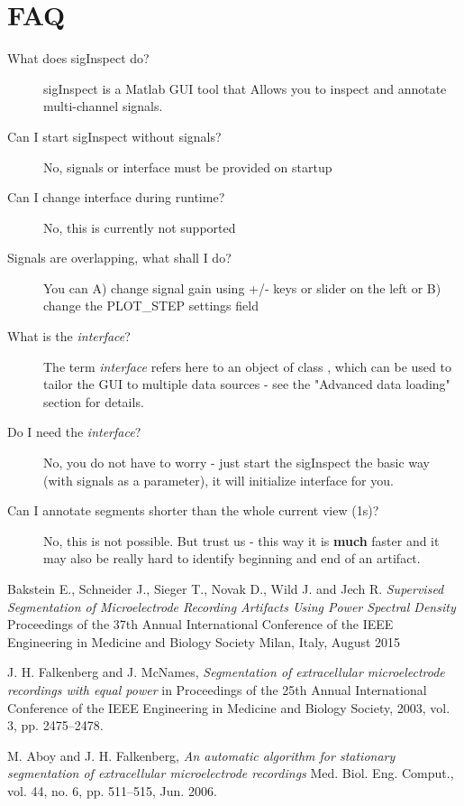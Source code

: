 \documentclass[a4paper,10pt]{article}
\begin{document}
\section{FAQ}
\begin{description}
	\item[What does sigInspect do?] sigInspect is a Matlab GUI tool that Allows you to inspect and annotate multi-channel signals.
	\item[Can I start sigInspect without signals?] No, signals or interface must be provided on startup
	\item[Can I change interface during runtime?] No, this is currently not supported
	\item[Signals are overlapping, what shall I do?] You can A) change signal gain using +/- keys or slider on the left or B) change the PLOT\_STEP settings field
\item[What is the \emph{interface}?] The term \emph{interface} refers here to an object of class , which can be used to tailor the GUI to multiple data sources - see the "Advanced data loading" section for details.
\item[Do I need the \emph{interface}?] No, you do not have to worry - just start the sigInspect the basic way (with signals as a parameter), it will initialize  interface for you.

	\item[Can I annotate segments shorter than the whole current view (1s)?] No, this is not possible. But trust us - this way it is \textbf{much} faster and it may also be really hard to identify beginning and end of an artifact.
\end{description}

\begin{thebibliography}{9}	
	Bakstein E., Schneider J., Sieger T., Novak D., Wild J. and Jech R.
	\emph{Supervised Segmentation of Microelectrode Recording Artifacts Using Power Spectral Density}
	Proceedings of the 37th Annual International Conference of the IEEE Engineering in Medicine and Biology Society
	Milan, Italy,
	August 2015
	
 J. H. Falkenberg and J. McNames, \emph{Segmentation of extracellular microelectrode recordings with equal power} in Proceedings of the 25th Annual International Conference of the IEEE Engineering in Medicine and Biology Society, 2003, vol. 3, pp. 2475–2478.

 M. Aboy and J. H. Falkenberg, \emph{An automatic algorithm for stationary segmentation of extracellular microelectrode recordings} Med. Biol. Eng. Comput., vol. 44, no. 6, pp. 511–515, Jun. 2006.
	
\end{thebibliography}
\end{document}
